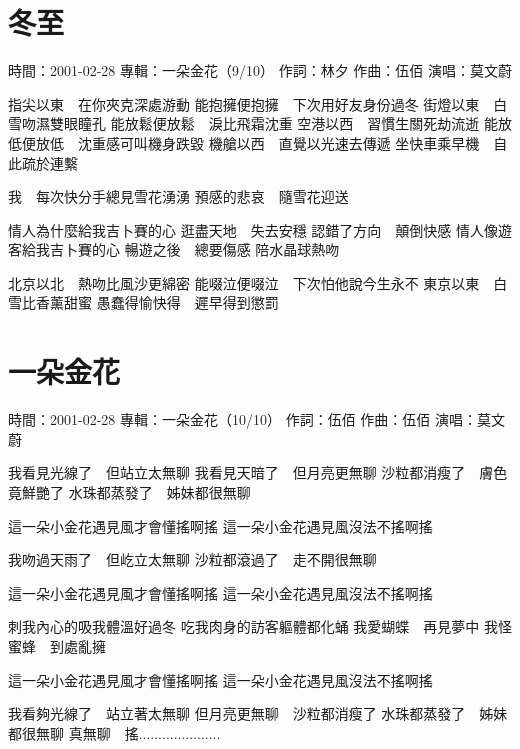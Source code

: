 \documentclass[UTF8,a4paper,oneside,twocolumn,12pt]{ctexbook}
\newcommand{\infopair}[2]{\textbullet #1：#2}
\newcommand{\zc}[1][伍佰]{\infopair{作詞}{#1}}
\newcommand{\zq}[1][伍佰]{\infopair{作曲}{#1}}
\newcommand{\zj}[1]{\infopair{專輯}{#1}}
\newcommand{\sj}[1]{\infopair{時間}{#1}}
\newenvironment{info}{\begin{flushleft}\kaishu
	}
	{\end{flushleft}\normalsize\yahei\par}
\newenvironment{lyric}{
	}
{}
\begin{document}
\section{冬至}
\begin{info}
	\sj{2001-02-28}
	\zj{一朵金花（9/10）}
	\zc[林夕]
	\zq
	\infopair{演唱}{莫文蔚}
\end{info}
\begin{lyric}
	指尖以東　在你夾克深處游動
	能抱擁便抱擁　下次用好友身份過冬
	街燈以東　白雪吻濕雙眼瞳孔
	能放鬆便放鬆　淚比飛霜沈重
	空港以西　習慣生關死劫流逝
	能放低便放低　沈重感可叫機身跌毀
	機艙以西　直覺以光速去傳遞
	坐快車乘早機　自此疏於連繫

	我　每次快分手總見雪花湧湧
	預感的悲哀　隨雪花迎送

	情人為什麼給我吉卜賽的心
	逛盡天地　失去安穩
	認錯了方向　顛倒快感
	情人像遊客給我吉卜賽的心
	暢遊之後　總要傷感
	陪水晶球熱吻

	北京以北　熱吻比風沙更綿密
	能啜泣便啜泣　下次怕他說今生永不
	東京以東　白雪比香薰甜蜜
	愚蠢得愉快得　遲早得到懲罰
\end{lyric}

\section{一朵金花}
\begin{info}
	\sj{2001-02-28}
	\zj{一朵金花（10/10）}
	\zc
	\zq
	\infopair{演唱}{莫文蔚}
\end{info}
\begin{lyric}
	我看見光線了　但站立太無聊
	我看見天暗了　但月亮更無聊
	沙粒都消瘦了　膚色竟鮮艷了
	水珠都蒸發了　姊妹都很無聊

	這一朵小金花遇見風才會懂搖啊搖
	這一朵小金花遇見風沒法不搖啊搖

	我吻過天雨了　但屹立太無聊
	沙粒都滾過了　走不開很無聊

	這一朵小金花遇見風才會懂搖啊搖
	這一朵小金花遇見風沒法不搖啊搖

	刺我內心的吸我體溫好過冬
	吃我肉身的訪客軀體都化蛹
	我愛蝴蝶　再見夢中
	我怪蜜蜂　到處亂擁

	這一朵小金花遇見風才會懂搖啊搖
	這一朵小金花遇見風沒法不搖啊搖

	我看夠光線了　站立著太無聊
	但月亮更無聊　沙粒都消瘦了
	水珠都蒸發了　姊妹都很無聊
	真無聊　搖.....................
\end{lyric}
\end{document}
